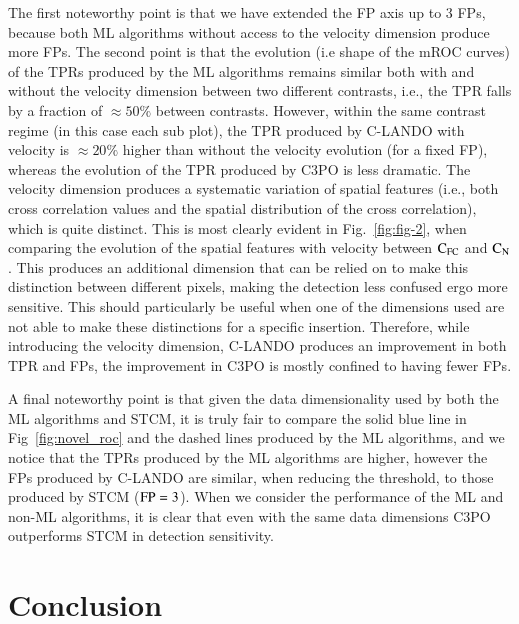 \documentclass{aa}
\begin{document}
The first noteworthy point is that we have extended the FP axis up to $3$ FPs, because both ML algorithms without access to the velocity dimension produce more FPs.
The second point is that the evolution (i.e shape of the mROC curves) of the TPRs produced by the ML algorithms remains similar both with and without the velocity dimension between two different contrasts, i.e., the TPR falls by a fraction of $\approx 50\%$ between contrasts.
However, within the same contrast regime (in this case each sub plot), the TPR produced by C-LANDO with velocity is $\approx 20\%$ higher than without the velocity evolution (for a fixed FP), whereas the evolution of the TPR produced by C3PO is less dramatic.
The velocity dimension produces a systematic variation of spatial features (i.e., both cross correlation values and the spatial distribution of the cross correlation), which is quite distinct.
This is most clearly evident in Fig.~\ref{fig:fig-2}, when comparing the evolution of the spatial features with velocity between $\rm{C_{FC}}$ and $\rm{C_N}$.
This produces an additional dimension that can be relied on to make this distinction between different pixels, making the detection less confused ergo more sensitive.
This should particularly be useful when one of the dimensions used are not able to make these distinctions for a specific insertion.
Therefore, while introducing the velocity dimension, C-LANDO produces an improvement in both TPR and FPs, the improvement in C3PO is mostly confined to having fewer FPs.

A final noteworthy point is that given the data dimensionality used by both the ML algorithms and STCM, it is truly fair to compare the solid blue line in Fig~\ref{fig:novel_roc} and the dashed lines produced by the ML algorithms, and we notice that the TPRs produced by the ML algorithms are higher, however the FPs produced by C-LANDO are similar, when reducing the threshold, to those produced by STCM (${\rm FP}=3$). 
When we consider the performance of the ML and non-ML algorithms, it is clear that even with the same data dimensions C3PO outperforms STCM in detection sensitivity.



\section{Conclusion}
\end{document}
